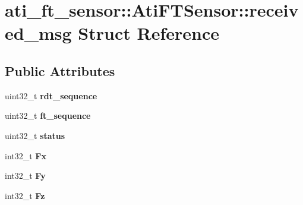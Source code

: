 \hypertarget{structati__ft__sensor_1_1AtiFTSensor_1_1received__msg}{}\section{ati\+\_\+ft\+\_\+sensor\+:\+:Ati\+F\+T\+Sensor\+:\+:received\+\_\+msg Struct Reference}
\label{structati__ft__sensor_1_1AtiFTSensor_1_1received__msg}
\subsection*{Public Attributes}
\begin{DoxyCompactItemize}
\item 
uint32\+\_\+t {\bfseries rdt\+\_\+sequence}\hypertarget{structati__ft__sensor_1_1AtiFTSensor_1_1received__msg_a6ddf19c84eee306ce762505c6c2cb443}{}\label{structati__ft__sensor_1_1AtiFTSensor_1_1received__msg_a6ddf19c84eee306ce762505c6c2cb443}

\item 
uint32\+\_\+t {\bfseries ft\+\_\+sequence}\hypertarget{structati__ft__sensor_1_1AtiFTSensor_1_1received__msg_a1c78752981a5fb93759c9f77a06934cd}{}\label{structati__ft__sensor_1_1AtiFTSensor_1_1received__msg_a1c78752981a5fb93759c9f77a06934cd}

\item 
uint32\+\_\+t {\bfseries status}\hypertarget{structati__ft__sensor_1_1AtiFTSensor_1_1received__msg_ab0feca418ea50b28924b94610e5adf9a}{}\label{structati__ft__sensor_1_1AtiFTSensor_1_1received__msg_ab0feca418ea50b28924b94610e5adf9a}

\item 
int32\+\_\+t {\bfseries Fx}\hypertarget{structati__ft__sensor_1_1AtiFTSensor_1_1received__msg_a1d3bd277f5c758c35059b3b8b7304798}{}\label{structati__ft__sensor_1_1AtiFTSensor_1_1received__msg_a1d3bd277f5c758c35059b3b8b7304798}

\item 
int32\+\_\+t {\bfseries Fy}\hypertarget{structati__ft__sensor_1_1AtiFTSensor_1_1received__msg_aa5608c692132d39d129b59c396d42ae7}{}\label{structati__ft__sensor_1_1AtiFTSensor_1_1received__msg_aa5608c692132d39d129b59c396d42ae7}

\item 
int32\+\_\+t {\bfseries Fz}\hypertarget{structati__ft__sensor_1_1AtiFTSensor_1_1received__msg_af0b5bc2426ff22e4171653b22ac35532}{}\label{structati__ft__sensor_1_1AtiFTSensor_1_1received__msg_af0b5bc2426ff22e4171653b22ac35532}


\end{DoxyCompactItemize}
